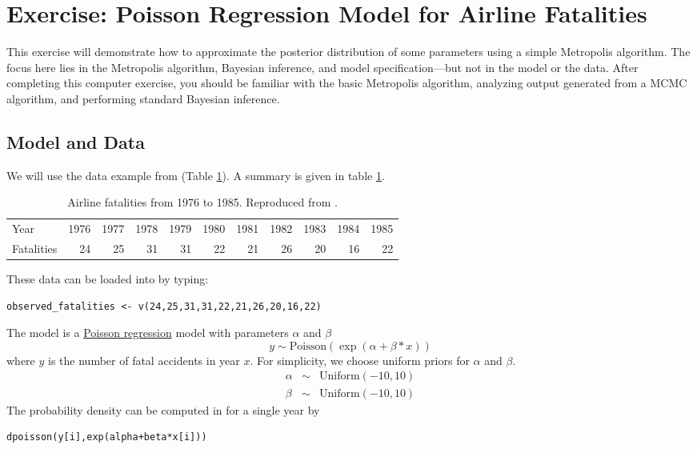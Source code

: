 \newpage
\FloatBarrier
\section{Exercise: Poisson Regression Model for Airline Fatalities}

This exercise will demonstrate how to approximate the posterior distribution of some parameters using a simple Metropolis algorithm. 
The focus here lies in the Metropolis algorithm, Bayesian inference, and model specification---but not in the model or the data. 
After completing this computer exercise, you should be familiar with the basic Metropolis algorithm, analyzing output generated from a MCMC algorithm, and performing standard Bayesian inference.

\subsection{Model and Data}
We will use the data example from \cite{Gelman2003} (Table \ref{tab:airlineFatalities}). 
A summary is given in table \ref{tab:airlineFatalities}.
\begin{table}[!hbtp]
\caption{Airline fatalities from 1976 to 1985. Reproduced from \cite[][Table 2.2 on p. 69]{gelman95}.}
\label{tab:airlineFatalities}
\smallskip
\centering
\begin{tabular}{ l | r r r r r r r r r r }
  \hline                       
  Year & 1976 & 1977 & 1978 & 1979 & 1980 & 1981 & 1982 & 1983 & 1984 & 1985 \\
  Fatalities & 24 & 25 & 31 & 31 & 22 & 21 & 26 & 20 & 16 & 22\\
  \hline  
\end{tabular}
\end{table}

These data can be loaded into \RevBayes by typing:
{\tt \begin{snugshade*}
\begin{lstlisting}    
observed_fatalities <- v(24,25,31,31,22,21,26,20,16,22)
\end{lstlisting}
\end{snugshade*}}

The model is a \href{http://en.wikipedia.org/wiki/Poisson_regression}{Poisson regression} model with parameters $\alpha$ and $\beta$
\begin{equation*}
y \sim \text{Poisson}(\exp(\alpha+\beta*x))
\end{equation*} 
where $y$ is the number of fatal accidents in year $x$. 
For simplicity, we choose uniform priors for $\alpha$ and $\beta$.
\begin{eqnarray*}
\alpha & \sim & \text{Uniform}(-10,10)\\
\beta &  \sim & \text{Uniform}(-10,10)
\end{eqnarray*}
The probability density can be computed in \RevBayes for a single year by
{\tt \begin{snugshade*}
\begin{lstlisting}    
dpoisson(y[i],exp(alpha+beta*x[i]))
\end{lstlisting}
\end{snugshade*}}

